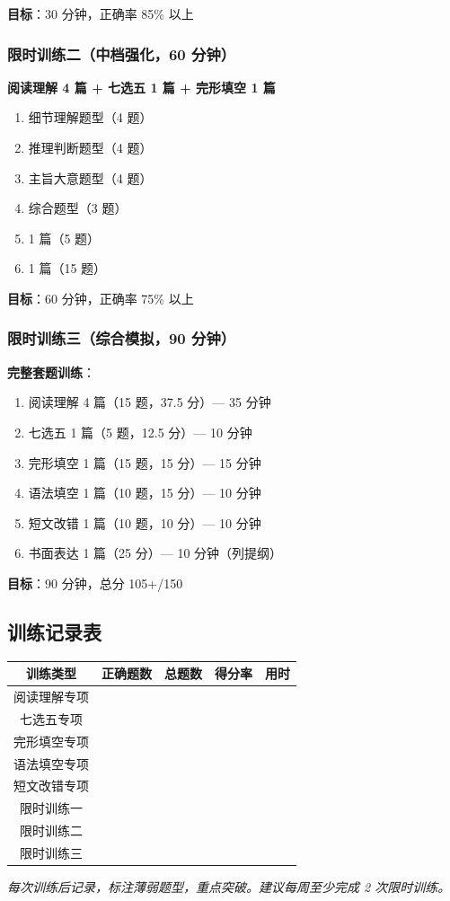 \textbf{目标}：30 分钟，正确率 85\% 以上

\subsubsection{限时训练二（中档强化，60 分钟）}

\textbf{阅读理解 4 篇 + 七选五 1 篇 + 完形填空 1 篇}

\begin{enumerate}
  \item[阅1] 细节理解题型（4 题）
  \item[阅2] 推理判断题型（4 题）
  \item[阅3] 主旨大意题型（4 题）
  \item[阅4] 综合题型（3 题）
  \item[七选五] 1 篇（5 题）
  \item[完形] 1 篇（15 题）
\end{enumerate}

\textbf{目标}：60 分钟，正确率 75\% 以上

\subsubsection{限时训练三（综合模拟，90 分钟）}

\textbf{完整套题训练}：
\begin{enumerate}
  \item 阅读理解 4 篇（15 题，37.5 分）— 35 分钟
  \item 七选五 1 篇（5 题，12.5 分）— 10 分钟
  \item 完形填空 1 篇（15 题，15 分）— 15 分钟
  \item 语法填空 1 篇（10 题，15 分）— 10 分钟
  \item 短文改错 1 篇（10 题，10 分）— 10 分钟
  \item 书面表达 1 篇（25 分）— 10 分钟（列提纲）
\end{enumerate}

\textbf{目标}：90 分钟，总分 105+/150

\subsection{训练记录表}

\begin{center}
\begin{tabular}{c|c|c|c|c}
\textbf{训练类型} & \textbf{正确题数} & \textbf{总题数} & \textbf{得分率} & \textbf{用时} \\ \toprule
阅读理解专项 & & & & \\
七选五专项 & & & & \\
完形填空专项 & & & & \\
语法填空专项 & & & & \\
短文改错专项 & & & & \\
限时训练一 & & & & \\
限时训练二 & & & & \\
限时训练三 & & & & \\
\bottomrule
\end{tabular}
\end{center}

\textit{每次训练后记录，标注薄弱题型，重点突破。建议每周至少完成 2 次限时训练。}
